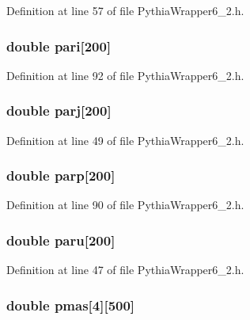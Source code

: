 Definition at line 57 of file Pythia\-Wrapper6\_\-2.h.
\subsubsection{\setlength{\rightskip}{0pt plus 5cm}double {\bf pari}[200]}\label{PythiaWrapper6__2_8h_bf6f48d977c7b10946e7c7e29702ce4e}




Definition at line 92 of file Pythia\-Wrapper6\_\-2.h.
\subsubsection{\setlength{\rightskip}{0pt plus 5cm}double {\bf parj}[200]}\label{PythiaWrapper6__2_8h_1f9cefc664796e0eabcddf6ffcb11da3}




Definition at line 49 of file Pythia\-Wrapper6\_\-2.h.
\subsubsection{\setlength{\rightskip}{0pt plus 5cm}double {\bf parp}[200]}\label{PythiaWrapper6__2_8h_58a4d650f8bc0e19901fff18146f039b}




Definition at line 90 of file Pythia\-Wrapper6\_\-2.h.
\subsubsection{\setlength{\rightskip}{0pt plus 5cm}double {\bf paru}[200]}\label{PythiaWrapper6__2_8h_96d7dd96f9b12a5a535143242e84eb09}




Definition at line 47 of file Pythia\-Wrapper6\_\-2.h.
\subsubsection{\setlength{\rightskip}{0pt plus 5cm}double {\bf pmas}[4][500]}\label{PythiaWrapper6__2_8h_bd8da8f731880bc187f5c2a22f4d115b}




